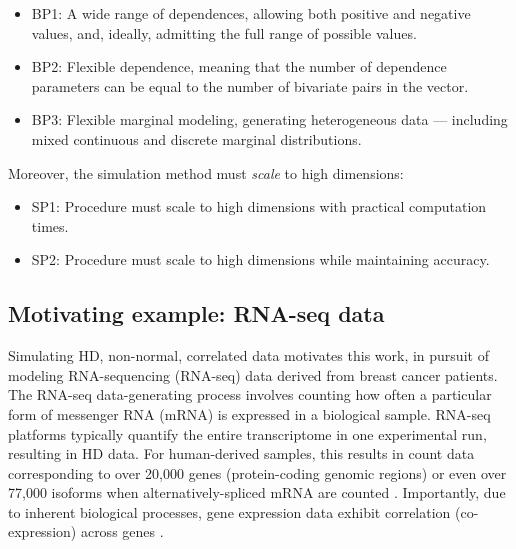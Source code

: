 \documentclass[
]{jss}
\providecommand{\tightlist}{%
  \setlength{\itemsep}{0pt}\setlength{\parskip}{0pt}}
\begin{document}

\begin{itemize}
\tightlist
\item
  BP1: A wide range of dependences, allowing both positive and negative values, and, ideally, admitting the full range of possible values.
\item
  BP2: Flexible dependence, meaning that the number of dependence parameters can be equal to the number of bivariate pairs in the vector.
\item
  BP3: Flexible marginal modeling, generating heterogeneous data --- including mixed continuous and discrete marginal distributions.
\end{itemize}


Moreover, the simulation method must \emph{scale} to high dimensions:


\begin{itemize}
\tightlist
\item
  SP1: Procedure must scale to high dimensions with practical computation times.
\item
  SP2: Procedure must scale to high dimensions while maintaining accuracy.
\end{itemize}


\hypertarget{motivating-example-rna-seq-data}{%
\subsection{Motivating example: RNA-seq data}\label{motivating-example-rna-seq-data}}

Simulating HD, non-normal, correlated data motivates this work, in pursuit of modeling RNA-sequencing (RNA-seq) data \citep{Wang2009b, Conesa2016b} derived from breast cancer patients. The RNA-seq data-generating process involves counting how often a particular form of messenger RNA (mRNA) is expressed in a biological sample. RNA-seq platforms typically quantify the entire transcriptome in one experimental run, resulting in HD data. For human-derived samples, this results in count data corresponding to over 20,000 genes (protein-coding genomic regions) or even over 77,000 isoforms when alternatively-spliced mRNA are counted \citep{Schissler2019}. Importantly, due to inherent biological processes, gene expression data exhibit correlation (co-expression) across genes \citep{BE07, Schissler2018}.
\end{document}

